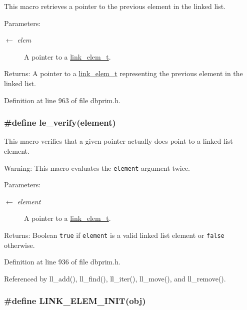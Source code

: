 This macro retrieves a pointer to the previous element in the linked list.

\begin{Desc}
\item[Parameters:]
\begin{description}
\item[\mbox{$\leftarrow$} {\em elem}]A pointer to a \hyperlink{group__dbprim__link_ga1}{link\_\-elem\_\-t}.\end{description}
\end{Desc}
\begin{Desc}
\item[Returns:]A pointer to a \hyperlink{group__dbprim__link_ga1}{link\_\-elem\_\-t} representing the previous element in the linked list.\end{Desc}


Definition at line 963 of file dbprim.h.\hypertarget{group__dbprim__link_ga22}{
\subsubsection[le\_\-verify]{\setlength{\rightskip}{0pt plus 5cm}\#define le\_\-verify(element)}}
\label{group__dbprim__link_ga22}


This macro verifies that a given pointer actually does point to a linked list element.

\begin{Desc}
\item[Warning:]This macro evaluates the {\tt element} argument twice.\end{Desc}
\begin{Desc}
\item[Parameters:]
\begin{description}
\item[\mbox{$\leftarrow$} {\em element}]A pointer to a \hyperlink{group__dbprim__link_ga1}{link\_\-elem\_\-t}.\end{description}
\end{Desc}
\begin{Desc}
\item[Returns:]Boolean {\tt true} if {\tt element} is a valid linked list element or {\tt false} otherwise.\end{Desc}


Definition at line 936 of file dbprim.h.

Referenced by ll\_\-add(), ll\_\-find(), ll\_\-iter(), ll\_\-move(), and ll\_\-remove().\hypertarget{group__dbprim__link_ga21}{
\subsubsection[LINK\_\-ELEM\_\-INIT]{\setlength{\rightskip}{0pt plus 5cm}\#define LINK\_\-ELEM\_\-INIT(obj)}}
\label{group__dbprim__link_ga21}


